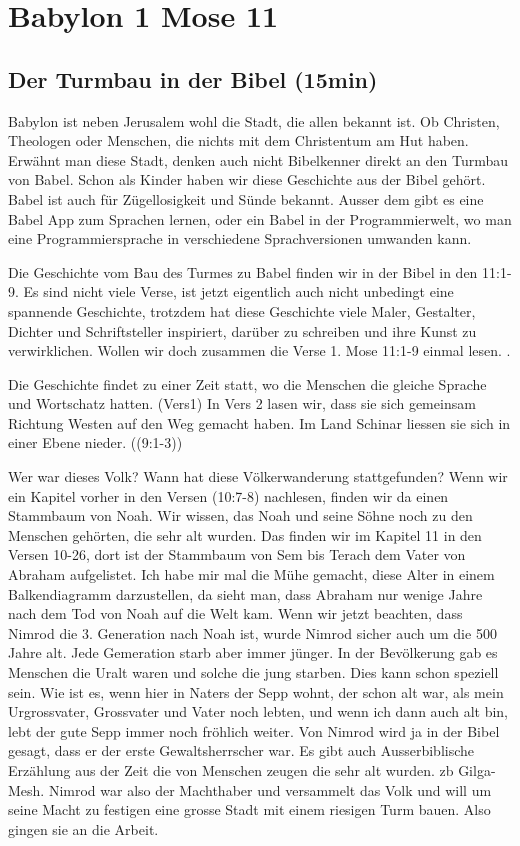 \documentclass[14pt]{../../inc/mybib}
\author{Lothar Schmid}
\begin{document}
\setlength{\baselineskip}{1.5\baselineskip}
\section{Babylon 1 Mose 11}

\subsection{Der Turmbau in der Bibel (15min)}        
    Babylon ist neben Jerusalem wohl die Stadt, die allen bekannt ist. Ob Christen, Theologen oder Menschen, die nichts mit dem Christentum am Hut haben. Erwähnt man diese Stadt, denken auch nicht Bibelkenner direkt an den Turmbau von Babel. Schon als Kinder haben wir diese Geschichte aus der Bibel gehört. Babel ist auch für Zügellosigkeit und Sünde bekannt. Ausser dem gibt es eine Babel App zum Sprachen lernen, oder ein Babel in der Programmierwelt, wo man eine Programmiersprache in verschiedene Sprachversionen umwanden kann.
    
    Die Geschichte vom Bau des Turmes zu Babel finden wir in der Bibel in den  {11:1-9}. Es sind nicht viele Verse, ist jetzt eigentlich auch nicht unbedingt eine spannende Geschichte, trotzdem hat diese Geschichte viele Maler, Gestalter, Dichter und Schriftsteller inspiriert, darüber zu schreiben und ihre Kunst zu verwirklichen. Wollen wir doch zusammen die Verse 1. Mose 11:1-9 einmal lesen. .

    Die Geschichte findet zu einer Zeit statt, wo die Menschen die gleiche Sprache und Wortschatz hatten. (Vers1) In Vers 2 lasen wir, dass sie sich gemeinsam Richtung Westen auf den Weg gemacht haben. Im Land Schinar liessen sie sich in einer Ebene nieder.  ((9:1-3))

    Wer war dieses Volk? Wann hat diese Völkerwanderung stattgefunden? Wenn wir ein Kapitel vorher in den Versen  (10:7-8) nachlesen, finden wir da einen Stammbaum von Noah. Wir wissen, das Noah und seine Söhne noch zu den Menschen gehörten, die sehr alt wurden. Das finden wir im Kapitel 11 in den Versen 10-26, dort ist der Stammbaum von Sem bis Terach dem Vater von Abraham aufgelistet. Ich habe mir mal die Mühe gemacht, diese Alter in einem Balkendiagramm darzustellen, da sieht man, dass Abraham nur wenige Jahre nach dem Tod von Noah auf die Welt kam. Wenn wir jetzt beachten, dass Nimrod die 3. Generation nach Noah ist, wurde Nimrod sicher auch um die 500 Jahre alt. Jede Gemeration starb aber immer jünger. In der Bevölkerung gab es Menschen die Uralt waren und solche die jung starben. Dies kann schon speziell sein. Wie ist es, wenn hier in Naters der Sepp wohnt, der schon alt war, als mein Urgrossvater, Grossvater und Vater noch lebten, und wenn ich dann auch alt bin, lebt der gute Sepp immer noch fröhlich weiter. Von Nimrod wird ja in der Bibel gesagt, dass er der erste Gewaltsherrscher war. Es gibt auch Ausserbiblische Erzählung aus der Zeit die von Menschen zeugen die sehr alt wurden. zb Gilga-Mesh. Nimrod war also der Machthaber und versammelt das Volk und will um seine Macht zu festigen eine grosse Stadt mit einem riesigen Turm bauen. Also gingen sie an die Arbeit. 
\end{document}
